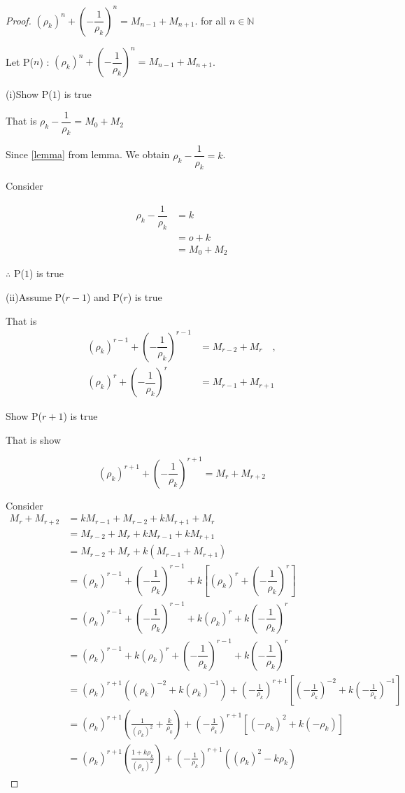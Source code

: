 \documentclass{rmutt-seminar}
\begin{document}
\begin{proof}
$(\rho_k )^n + \left(-\dfrac{1}{\rho_k }\right)^n = M_{n-1} + M_{n+1} $. for all $n \in \mathbb{N}$

\quad Let P($n$) : $(\rho_k) ^n + \left(-\dfrac{1}{\rho_k }\right)^n = M_{n-1} + M_{n+1} $. 

\quad (i)\quad Show P($1$) is true 

\quad \quad \quad That is $\rho_k -\dfrac{1}{\rho_k} = M_{0} + M_{2} $ 
 
\quad \quad \quad Since \eqref{lemma} from lemma. We obtain \quad $\rho_k-\dfrac{1}{\rho_k}=k$.

\quad \quad \quad Consider

 \begin{align*}
 	\rho_k - \dfrac{1}{\rho_k} &= k\\
 	&= o + k\\
 	&= M_{0} + M_{2}
 \end{align*}
 
\quad \quad \quad $\therefore$ P($1$) is true
 
\quad (ii)\quad Assume P($r-1$) and P($r$) is true

\quad \quad \quad That is 
\begin{align*}
	(\rho_k)^{r-1} + \left(-\dfrac{1}{\rho_k}\right)^{r-1} &= M_{r-2} + M_{r} \quad, \\
	(\rho_k)^{r} + \left(-\dfrac{1}{\rho_k}\right)^{r} &= M_{r-1} + M_{r+1}
\end{align*}

\quad \quad \quad Show P($r+1$) is true
 
\quad \quad \quad That is show 
 
$$ (\rho_k)^{r+1} + \left(-\dfrac{1}{\rho_k}\right)^{r+1}= M_{r} + M_{r+2} $$

\quad \quad \quad Consider
\begin{align*}
	M_{r} + M_{r+2} &= kM_{r-1} + M_{r-2} + kM_{r+1} + M_r \\
	&= M_{r-2} + M_r + kM_{r-1} + kM_{r+1} \\ 
	&= M_{r-2} + M_r + k(M_{r-1} + M_{r+1}) \\
	&= (\rho_k)^{r-1} + \left(-\dfrac{1}{\rho_k}\right)^{r-1} +k\left[(\rho_k)^{r} + \left(-\dfrac{1}{\rho_k}\right)^{r}\right] \\
	&= (\rho_k)^{r-1} + \left(-\dfrac{1}{\rho_k}\right)^{r-1} +k(\rho_k)^{r} + k\left(-\dfrac{1}{\rho_k}\right)^{r}\ \\
	&= (\rho_k)^{r-1}+k(\rho_k)^{r}  + \left(-\dfrac{1}{\rho_k}\right)^{r-1} + k\left(-\dfrac{1}{\rho_k}\right)^{r}\ \\
	&= (\rho_k)^{r+1}((\rho_k)^{-2} + k(\rho_k)^{-1}) + \left(-\frac{1}{\rho_k}\right)^{r+1} \left[ \left(-\frac{1}{\rho_k}\right)^{-2} + k\left(-\frac{1}{\rho_k}\right)^{-1}\right] \\
	&= (\rho_k)^{r+1} \left(\frac{1}{(\rho_k)^2} + \frac{k}{\rho_k}\right) + \left(-\frac{1}{\rho_k}\right)^{r+1}[(-\rho_k)^2+k(-\rho_k)] \\
	&= (\rho_k)^{r+1}\left(\frac{1+k\rho_k}{(\rho_k)^2}\right)+\left(-\frac{1}{\rho_k}\right)^{r+1}((\rho_k)^2-k\rho_k)
\end{align*}


\end{proof}
\end{document}

